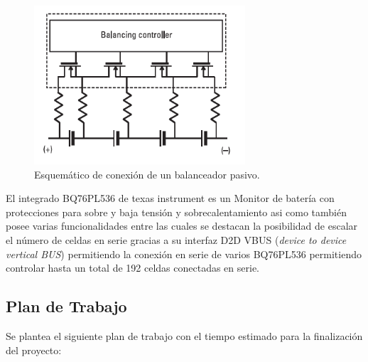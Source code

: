 \documentclass[10pt,a4paper]{article}
\begin{document}
	\begin{figure}[h!]
		\begin{center}
			\includegraphics[width=0.7\textwidth]{passive_equalizator.png}
			\caption{Esquemático de conexión de un balanceador pasivo.}
			\label{passive_equalizator}
		\end{center}
	\end{figure}
	

	El integrado BQ76PL536 de texas instrument es un Monitor de batería con 
    protecciones para sobre y baja tensión y sobrecalentamiento asi como también 
    posee varias funcionalidades entre las cuales se destacan la posibilidad de 
    escalar el número de celdas en serie gracias a su interfaz D2D VBUS 
    (\emph{device to device vertical BUS}) permitiendo la conexión en serie de 
    varios BQ76PL536 permitiendo controlar hasta un total de 192 celdas
    conectadas en serie.

	
	\clearpage
	\subsection{Plan de Trabajo}
	
	Se plantea el siguiente plan de trabajo con el tiempo estimado para la 
    finalización del proyecto:
	
\end{document}
